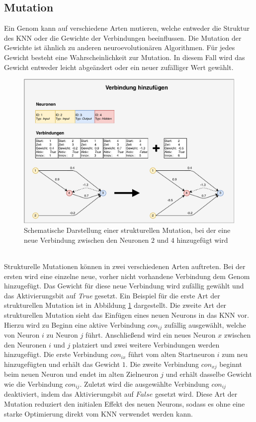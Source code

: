 \subsection{Mutation}
\label{subsec:neat_mutation}
Ein Genom kann auf verschiedene Arten mutieren, welche entweder die Struktur des \ac{KNN} oder die Gewichte der Verbindungen beeinflussen. Die Mutation der Gewichte ist ähnlich zu anderen neuroevolutionären Algorithmen. Für jedes Gewicht besteht eine Wahrscheinlichkeit zur Mutation. In diesem Fall wird das Gewicht entweder leicht abgeändert oder ein neuer zufälliger Wert gewählt.
\begin{figure}[!h]
	\centering
	\includegraphics[width=1\textwidth]{./img/neat-AddConnectionMutation.pdf} 
	\caption{Schematische Darstellung einer strukturellen Mutation, bei der eine neue Verbindung zwischen den Neuronen $2$ und $4$ hinzugefügt wird}
	\label{fig:neat_add_connectin_mutation}
\end{figure}
\\ \noindent
Strukturelle Mutationen können in zwei verschiedenen Arten auftreten. Bei der ersten wird eine einzelne neue, vorher nicht vorhandene Verbindung dem Genom hinzugefügt. Das Gewicht für diese neue Verbindung wird zufällig gewählt und das Aktivierungsbit auf \emph{True} gesetzt. Ein Beispiel für die erste Art der strukturellen Mutation ist in Abbildung \ref{fig:neat_add_connectin_mutation} dargestellt. Die zweite Art der strukturellen Mutation sieht das Einfügen eines neuen Neurons in das \ac{KNN} vor. Hierzu wird zu Beginn eine aktive Verbindung $con_{ij} $ zufällig ausgewählt, welche von Neuron $i$ zu Neuron $j$ führt. Anschließend wird ein neues Neuron $x$ zwischen den Neuronen $i$ und $j$ platziert und zwei weitere Verbindungen werden hinzugefügt. Die erste Verbindung $con_{ix}$ führt vom alten Startneuron $i$ zum neu hinzugefügten und erhält das Gewicht $1$. Die zweite Verbindung $con_{xj}$ beginnt beim neuen Neuron und endet im alten Zielneuron $j$ und erhält dasselbe Gewicht wie die Verbindung $con_{ij}$. Zuletzt wird die ausgewählte Verbindung $con_{ij}$ deaktiviert, indem das Aktivierungsbit auf $False$ gesetzt wird. Diese Art der Mutation reduziert den initialen Effekt des neuen Neurons, sodass es ohne eine starke Optimierung direkt vom \ac{KNN} verwendet werden kann.
